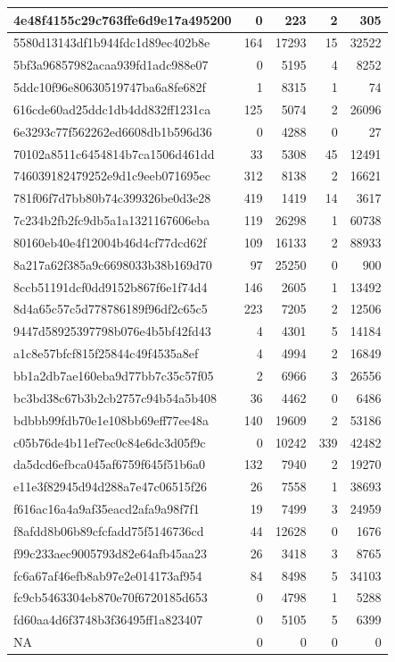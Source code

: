 \documentclass[]{article}
\begin{document}
\begin{table}[t]
\begin{tabular}{l|r|r|r|r}
\hline
4e48f4155c29c763ffe6d9e17a495200 & 0 & 223 & 2 & 305\\
\hline
5580d13143df1b944fdc1d89ec402b8e & 164 & 17293 & 15 & 32522\\
\hline
5bf3a96857982acaa939fd1adc988e07 & 0 & 5195 & 4 & 8252\\
\hline
5ddc10f96e80630519747ba6a8fe682f & 1 & 8315 & 1 & 74\\
\hline
616cde60ad25ddc1db4dd832ff1231ca & 125 & 5074 & 2 & 26096\\
\hline
6e3293c77f562262ed6608db1b596d36 & 0 & 4288 & 0 & 27\\
\hline
70102a8511c6454814b7ca1506d461dd & 33 & 5308 & 45 & 12491\\
\hline
746039182479252e9d1c9eeb071695ec & 312 & 8138 & 2 & 16621\\
\hline
781f06f7d7bb80b74c399326be0d3e28 & 419 & 1419 & 14 & 3617\\
\hline
7c234b2fb2fc9db5a1a1321167606eba & 119 & 26298 & 1 & 60738\\
\hline
80160eb40e4f12004b46d4cf77dcd62f & 109 & 16133 & 2 & 88933\\
\hline
8a217a62f385a9c6698033b38b169d70 & 97 & 25250 & 0 & 900\\
\hline
8ccb51191dcf0dd9152b867f6e1f74d4 & 146 & 2605 & 1 & 13492\\
\hline
8d4a65c57c5d778786189f96df2c65c5 & 223 & 7205 & 2 & 12506\\
\hline
9447d58925397798b076e4b5bf42fd43 & 4 & 4301 & 5 & 14184\\
\hline
a1c8e57bfcf815f25844c49f4535a8ef & 4 & 4994 & 2 & 16849\\
\hline
bb1a2db7ae160eba9d77bb7c35c57f05 & 2 & 6966 & 3 & 26556\\
\hline
bc3bd38c67b3b2cb2757c94b54a5b408 & 36 & 4462 & 0 & 6486\\
\hline
bdbbb99fdb70e1e108bb69eff77ee48a & 140 & 19609 & 2 & 53186\\
\hline
c05b76de4b11ef7ec0c84e6dc3d05f9c & 0 & 10242 & 339 & 42482\\
\hline
da5dcd6efbca045af6759f645f51b6a0 & 132 & 7940 & 2 & 19270\\
\hline
e11e3f82945d94d288a7e47c06515f26 & 26 & 7558 & 1 & 38693\\
\hline
f616ac16a4a9af35eacd2afa9a98f7f1 & 19 & 7499 & 3 & 24959\\
\hline
f8afdd8b06b89cfcfadd75f5146736cd & 44 & 12628 & 0 & 1676\\
\hline
f99c233aec9005793d82e64afb45aa23 & 26 & 3418 & 3 & 8765\\
\hline
fc6a67af46efb8ab97e2e014173af954 & 84 & 8498 & 5 & 34103\\
\hline
fc9cb5463304eb870e70f6720185d653 & 0 & 4798 & 1 & 5288\\
\hline
fd60aa4d6f3748b3f36495ff1a823407 & 0 & 5105 & 5 & 6399\\
\hline
NA & 0 & 0 & 0 & 0\\
\hline
\end{tabular}
\end{table}
\end{document}
